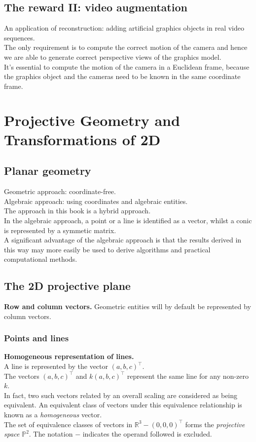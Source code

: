 \documentclass[12pt]{article}
\begin{document}
\subsection{The reward \textrm{II}: video augmentation}
An application of reconstruction: adding artificial graphics objects in real video sequences. \\
The only requirement is to compute the correct motion of the camera and hence we are able to 
generate correct perspective views of the graphics model. \\
It's essential to compute the motion of the camera in a Euclidean frame, because the graphics object and 
the cameras need to be known in the same coordinate frame. \\

\section{Projective Geometry and Transformations of 2D}
\subsection{Planar geometry}
Geometric approach: coordinate-free. \\
Algebraic approach: using coordinates and algebraic entities. \\
The approach in this book is a hybrid approach. \\
In the algebraic approach, a point or a line is identified as a vector, whilst a conic is 
represented by a symmetic matrix. \\
A significant advantage of the algebraic approach is that the results derived
in this way may more easily be used to derive algorithms and practical computational methods. \\

\subsection{The 2D projective plane}
\textbf{Row and column vectors.} Geometric entities will by default be represented by column vectors. 

\subsubsection{Points and lines}
\textbf{Homogeneous representation of lines.} \\
A line is represented by the vector $ {(a, b, c)}^\top $. \\
The vectors ${(a,b,c)}^\top$ and $k{(a,b,c)}^\top$ represent the same line for any non-zero $k$. \\
In fact, two such vectors related by an overall scaling are considered as being equivalent. 
An equivalent class of vectors under this equivalence relationship is known as a \textit{homogeneous} vector. \\
The set of equivalence classes of vectors in $\mathbb{R}^3 - {(0,0,0)}^\top$ forms the \textit{projective space} 
$\mathbb{P}^2$. The notation $-$ indicates the operand followed is excluded. \\
\end{document}
